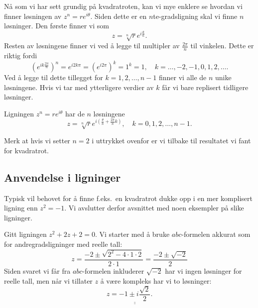 \documentclass[a4paper,norsk,12pt]{article}
\newcommand{\ans}[1]{\underline{\underline{#1}}}
\newcounter{exa}
\begin{document}
Nå som vi har sett grundig på kvadratroten, kan vi mye enklere se hvordan vi finner løsningen av $z^n = re^{i\theta}$. Siden dette er en $n$te-gradsligning skal vi finne $n$ løsninger. Den første finner vi som
\begin{displaymath}
	z = \sqrt[n]{r}e^{i\frac{\theta}{n}}.
\end{displaymath}
Resten av løsningene finner vi ved å legge til multipler av $\frac{2\pi}{n}$ til vinkelen. Dette er riktig fordi
\begin{displaymath}
	\left(e^{ik\frac{2\pi}{n}}\right)^n = e^{i2k\pi} = (e^{i2\pi})^k = 1^k = 1, \quad k =  \ldots, -2, -1, 0, 1, 2, \ldots.
\end{displaymath}
Ved å legge til dette tillegget for $k=1, 2, \ldots, n-1$ finner vi alle de $n$ unike løsningene. Hvis vi tar med ytterligere verdier av $k$ får vi bare replisert tidligere løsninger.
\begin{tsummary}
	Ligningen $z^n = re^{i\theta}$ har de $n$ løsningene
	\begin{displaymath}
		z = \sqrt[n]{r}e^{i\left(\frac{\theta}{n} + \frac{2\pi}{n}k\right)}, \quad k=0,1,2,\ldots, n-1.
	\end{displaymath}
\end{tsummary}
\noindent
Merk at hvis vi setter $n=2$ i uttrykket ovenfor er vi tilbake til resultatet vi fant for kvadratrot.

\subsection{Anvendelse i ligninger}
Typisk vil behovet for å finne f.eks.~en kvadratrot dukke opp i en mer komplisert ligning enn $z^2=-1$. Vi avslutter derfor avsnittet med noen eksempler på slike ligninger.
\begin{texample}
Gitt ligningen $z^2 + 2z + 2 = 0$. Vi starter med å bruke $abc$-formelen akkurat som for andregradsligninger med reelle tall:
\begin{displaymath}
	z = \frac{-2\pm\sqrt{2^2-4\cdot1\cdot2}}{2\cdot 1}= \frac{-2\pm\sqrt{-2}}{2}
\end{displaymath}
Siden svaret vi får fra $abc$-formelen inkluderer $\sqrt{-2}$ har vi ingen løsninger for reelle tall, men når vi tillater $z$ å være kompleks har vi to løsninger:
\begin{displaymath}
	z= \ans{-1 \pm i\frac{\sqrt{2}}{2}}.
\end{displaymath}
\end{texample}
\end{document}
